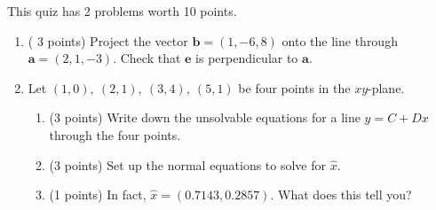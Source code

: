 \documentclass[11pt,fleqn]{article}
\begin{document}
\renewcommand{\headrulewidth}{0pt}
\newcommand{\blank}[1]{\rule{#1}{0.75pt}}
\renewcommand{\d}{\displaystyle}

This quiz has 2 problems worth 10 points.
\begin{enumerate}
\item ( 3 points) Project the vector $\mathbf{b}=(1,-6,8)$ onto the line through $\mathbf{a}=(2,1,-3).$ Check that $\mathbf{e}$ is perpendicular to $\mathbf{a}.$
\vfill
\newpage
\thispagestyle{empty}
\item Let $(1,0), \: (2,1), \: (3,4), \: (5,1)$ be four points in the $xy$-plane.
	\begin{enumerate}
	\item (3 points) Write down the unsolvable equations for a line $y=C+Dx$ through the four points.
	\vfill
	\item (3 points) Set up the normal equations to solve for $\hat{x}$.
	\vfill
	\item (1 points) In fact, $\hat{x}=(0.7143,0.2857).$ What does this tell you?
	\vspace{.5in}
	\end{enumerate}
\end{enumerate}
\end{document}
